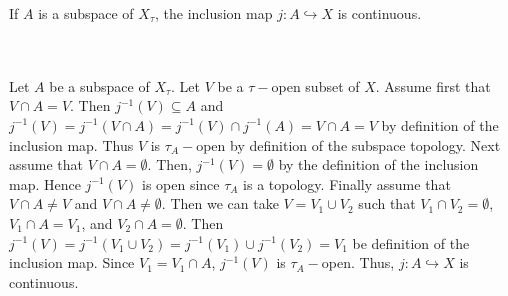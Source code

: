 If $A$ is a subspace of $X_{\tau}$, the inclusion map $j:A\hookrightarrow X$ is continuous.\\\\


\begin{solution}\renewcommand{\qedsymbol}{}\ \\
    Let $A$ be a subspace of $X_{\tau}$. Let $V$ be a $\tau-$open subset of $X$. Assume first that
    $V\cap A=V$. Then $j^{-1}(V)\subseteq A$ and
    $j^{-1}(V)=j^{-1}(V\cap A)=j^{-1}(V)\cap j^{-1}(A)=V\cap A=V$ by definition of the inclusion map.
    Thus $V$ is $\tau_{A}-$open by definition of the subspace topology. Next assume that
    $V\cap A=\emptyset$. Then, $j^{-1}(V)=\emptyset$ by the definition of the inclusion map. Hence
    $j^{-1}(V)$ is open since $\tau_{A}$ is a topology. Finally assume that $V\cap A\neq V$ and
    $V\cap A\neq\emptyset$. Then we can take $V=V_1\cup V_2$ such that $V_1\cap V_2=\emptyset$,
    $V_1\cap A=V_1$, and $V_2\cap A=\emptyset$. Then
    $j^{-1}(V)=j^{-1}(V_1\cup V_2)=j^{-1}(V_1)\cup j^{-1}(V_2)=V_1$ be definition of the inclusion map.
    Since $V_1=V_1\cap A$, $j^{-1}(V)$ is $\tau_{A}-$open. Thus, $j:A\hookrightarrow X$ is continuous.

\end{solution}